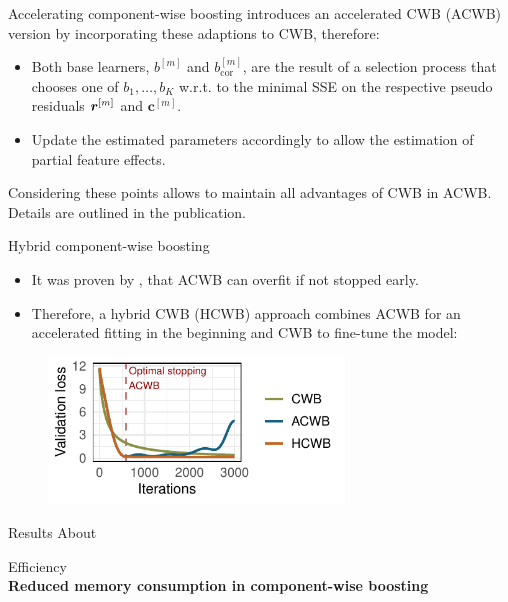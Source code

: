 \documentclass[10pt]{beamer}
\begin{document}
\begin{frame}{Accelerating component-wise boosting}
  \citet{schalk2022accelerated} introduces an accelerated CWB (ACWB)
  version by incorporating these adaptions to CWB, therefore:

  \begin{itemize}
    \item
      Both base learners, \(b^{[m]}\) and \(b^{[m]}_{\text{cor}}\), are the
      result of a selection process that chooses one of \(b_1, \dots, b_K\)
      w.r.t. to the minimal SSE on the respective pseudo residuals \(\bm{r}^{[m]}\)
      and \(\bm{c}^{[m]}\).
    \item
      Update the estimated parameters accordingly to allow the estimation of
      partial feature effects.
  \end{itemize}
  Considering these points allows to maintain all advantages of CWB in
  ACWB. Details are outlined in the publication.
\end{frame}

\begin{frame}{Hybrid component-wise boosting}
  \begin{itemize}
    \item
      It was proven by \citet{lu2020accelerating}, that ACWB can overfit if
      not stopped early.
    \item
      Therefore, a hybrid CWB (HCWB) approach combines ACWB for an accelerated fitting in the beginning and CWB
      to fine-tune the model:
  \end{itemize}

  \begin{figure}
    \centering
    \includegraphics[width=0.7\textwidth]{figures/fig-HCWB.pdf}
  \end{figure}
\end{frame}


\begin{frame}{Results}
  About
\end{frame}

\begin{frame}[plain]{}
  \Large Efficiency\\[0.3cm]
  {\LARGE\textbf{Reduced memory consumption in component-wise boosting}}
\end{frame}
\end{document}
